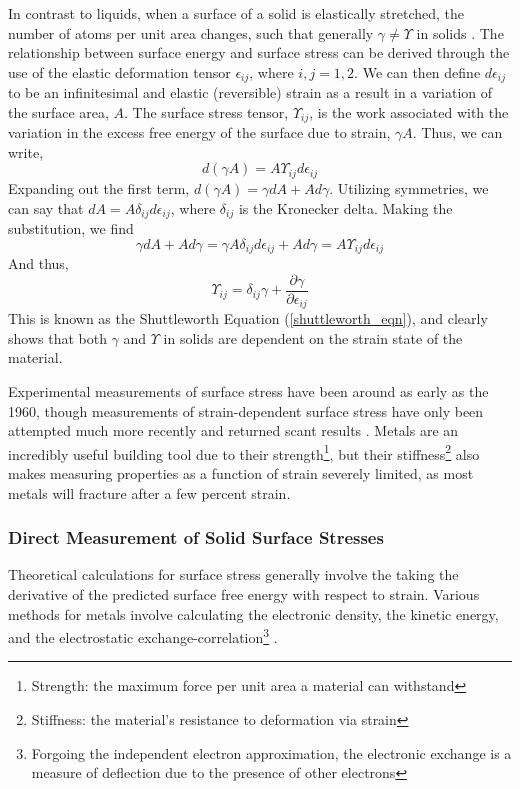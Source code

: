 In contrast to liquids, when a surface of a solid is elastically stretched, the number of atoms per unit area changes, such that generally $ \gamma \neq \Upsilon$ in solids \cite{cammarata1994surface}. The relationship between surface energy and surface stress can be derived through the use of the elastic deformation tensor $\epsilon_{ij}$, where $i,j=1,2$. We can then define $d\epsilon_{ij}$ to be an infinitesimal and elastic (reversible) strain as a result in a variation of the surface area, $A$. The surface stress tensor, $\Upsilon_{ij}$, is the work associated with the variation in the excess free energy of the surface due to strain, $\gamma A$. Thus, we can write, \[d(\gamma A) = A \Upsilon_{ij} d\epsilon_{ij}\] Expanding out the first term, $d(\gamma A) = \gamma dA + A d\gamma$. Utilizing symmetries, we can say that $dA = A \delta_{ij} d\epsilon_{ij}$, where $\delta_{ij}$ is the Kronecker delta. Making the substitution, we find \[\gamma dA + A d\gamma = \gamma A \delta_{ij} d\epsilon_{ij} + A d\gamma = A \Upsilon_{ij} d\epsilon_{ij}\] And thus,
\begin{equation}
\label{shuttleworth_eqn}
\Upsilon_{ij} = \delta_{ij}\gamma + \frac{\partial \gamma}{\partial \epsilon_{ij}} 
\end{equation}
This is known as the Shuttleworth Equation (\ref{shuttleworth_eqn}), and clearly shows that both $\gamma$ and $\Upsilon$ in solids are dependent on the strain state of the material.


Experimental measurements of surface stress have been around as early as the 1960, though measurements of strain-dependent surface stress have only been attempted much more recently and returned scant results \cite{mays1968surface,wasserman1970determination,hanneman1962elastic,martinez1990direct,schell1990mechanical}. Metals are an incredibly useful building tool due to their strength\footnote{Strength: the maximum force per unit area a material can withstand}, but their stiffness\footnote{Stiffness: the material's resistance to deformation via strain} also makes measuring properties as a function of strain severely limited, as most metals will fracture after a few percent strain.

\subsubsection{Direct Measurement of Solid Surface Stresses}
Theoretical calculations for surface stress generally involve the taking the derivative of the predicted surface free energy with respect to strain. Various methods for metals involve calculating the electronic density, the kinetic energy, and the electrostatic exchange-correlation\footnote{Forgoing the independent electron approximation, the electronic exchange is a measure of deflection due to the presence of other electrons} \cite{GURTIN1978431}. 

